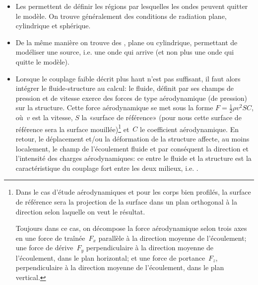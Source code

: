 {\begin{itemize}
   \item Les  permettent de définir les régions par lesquelles les ondes peuvent quitter le modèle. On trouve généralement des conditions de radiation plane, cylindrique et sphérique.
   \item De la même manière on trouve des , plane ou cylindrique, permettant de modéliser une source, i.e. une onde qui arrive (et non plus une onde qui quitte le modèle).
   
   \item Lorsque le couplage faible décrit plus haut n'est pas suffisant, il faut alors intégrer le  fluide-structure au calcul: le fluide, définit par ses champs de pression et de vitesse exerce des forces de type aérodynamique (de pression) sur la structure. Cette force aérodynamique se met sous la forme $F = \frac12 \rho v^2SC$, où~$v$ est la vitesse, $S$ la «surface de référence» (pour nous cette surface de référence sera la surface mouillée)\footnote{Dans le cas d'étude aérodynamiques et pour les corps bien profilés, la surface de référence sera la projection de la surface dans un plan orthogonal à la direction selon laquelle on veut le résultat.
   
   Toujours dans ce cas, on décompose la force aérodynamique selon trois axes en une force de traînée~$F_x$ parallèle à la direction moyenne de l'écoulement; une force de dérive~$F_y$ perpendiculaire à la direction moyenne de l'écoulement, dans le plan horizontal; et une force de portance~$F_z$, perpendiculaire à la direction moyenne de l'écoulement, dans le plan vertical.} et~$C$ le coefficient aérodynamique. En retour, le déplacement et/ou la déformation de la structure affecte, au moins localement, le champ de l'écoulement fluide et par conséquent la direction et l'intensité des charges aérodynamiques: ce  entre le fluide et la structure est la caractéristique du couplage fort entre les deux milieux, i.e. .


\end{itemize}}
